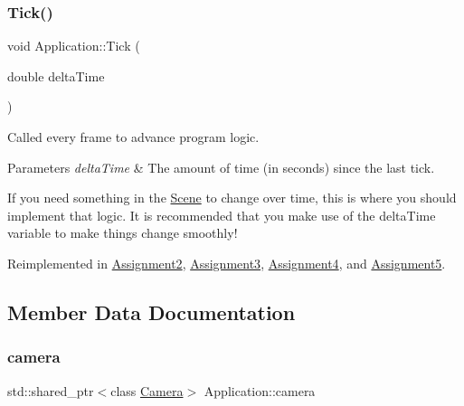 \hypertarget{class_application_a0800afd5651153d31fa775a8048d14dd}{}\label{class_application_a0800afd5651153d31fa775a8048d14dd}
\subsubsection{\texorpdfstring{Tick()}{Tick()}}
{\footnotesize\ttfamily void Application\+::\+Tick (\begin{DoxyParamCaption}\item[{double}]{delta\+Time }\end{DoxyParamCaption})\hspace{0.3cm}{\ttfamily [virtual]}}



Called every frame to advance program logic.


\begin{DoxyParams}{Parameters}
{\em delta\+Time} & The amount of time (in seconds) since the last tick.\\
\hline
\end{DoxyParams}
If you need something in the \hyperlink{class_scene}{Scene} to change over time, this is where you should implement that logic. It is recommended that you make use of the delta\+Time variable to make things change smoothly!

Reimplemented in \hyperlink{class_assignment2_a41544ad361dd798d5fae1ec3197fc66e}{Assignment2}, \hyperlink{class_assignment3_a11256b6e7b38ab24baa92729cfb8ffe2}{Assignment3}, \hyperlink{class_assignment4_a3ef3fef7a6ae13603bc453b29e079c5d}{Assignment4}, and \hyperlink{class_assignment5_a34cdf7bc962c3a0e3959c77a24c54d79}{Assignment5}.



\subsection{Member Data Documentation}
\hypertarget{class_application_a0e8589fcb13c520ba472473abe5a518d}{}\label{class_application_a0e8589fcb13c520ba472473abe5a518d}
\subsubsection{\texorpdfstring{camera}{camera}}
{\footnotesize\ttfamily std\+::shared\+\_\+ptr$<$class \hyperlink{class_camera}{Camera}$>$ Application\+::camera\hspace{0.3cm}{\ttfamily [protected]}}



